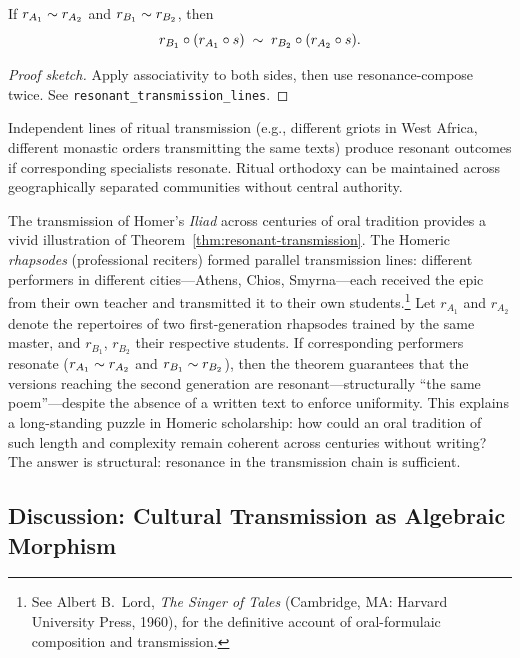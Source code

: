 \begin{theorem}
\label{thm:resonant-transmission}
If $r_{A_1} \sim r_{A_2}$ and $r_{B_1} \sim r_{B_2}$, then
\[
  r_{B_1} \circ (r_{A_1} \circ s)
  \;\sim\;
  r_{B_2} \circ (r_{A_2} \circ s).
\]
\end{theorem}

\begin{proof}[Proof sketch]
Apply associativity to both sides, then use resonance-compose twice.
See \texttt{resonant\_transmission\_lines}.
\end{proof}

\begin{remark}
Independent lines of ritual transmission (e.g., different griots in West
Africa, different monastic orders transmitting the same texts) produce
resonant outcomes if corresponding specialists resonate.  Ritual
orthodoxy can be maintained across geographically separated communities
without central authority.
\end{remark}

\begin{example}
\label{ex:homeric-tradition}
The transmission of Homer's \emph{Iliad} across centuries of oral
tradition provides a vivid illustration of
Theorem~\ref{thm:resonant-transmission}.  The Homeric \emph{rhapsodes}
(professional reciters) formed parallel transmission lines: different
performers in different cities---Athens, Chios, Smyrna---each received
the epic from their own teacher and transmitted it to their own
students.\footnote{See Albert B.\ Lord, \emph{The Singer of Tales}
(Cambridge, MA: Harvard University Press, 1960), for the definitive
account of oral-formulaic composition and transmission.}  Let $r_{A_1}$
and $r_{A_2}$ denote the repertoires of two first-generation rhapsodes
trained by the same master, and $r_{B_1}$, $r_{B_2}$ their respective
students.  If corresponding performers resonate ($r_{A_1} \sim r_{A_2}$
and $r_{B_1} \sim r_{B_2}$), then the theorem guarantees that the
versions reaching the second generation are resonant---structurally
``the same poem''---despite the absence of a written text to enforce
uniformity.  This explains a long-standing puzzle in Homeric scholarship:
how could an oral tradition of such length and complexity remain
coherent across centuries without writing?  The answer is structural:
resonance in the transmission chain is sufficient.
\end{example}

\subsection*{Discussion: Cultural Transmission as Algebraic Morphism}

